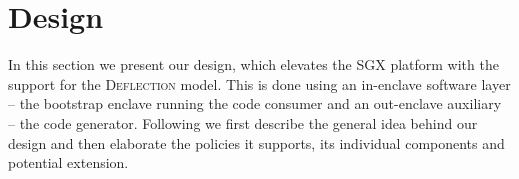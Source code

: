 \section{Design}\label{sec-design}




In this section we present our design, which elevates the SGX platform with the support for the \textsc{Deflection} model. This is done using an in-enclave software layer -- the bootstrap enclave running the code consumer and an out-enclave auxiliary -- the code generator. Following we first describe the general idea behind our design and then elaborate the policies it supports, its individual components and potential extension.     




